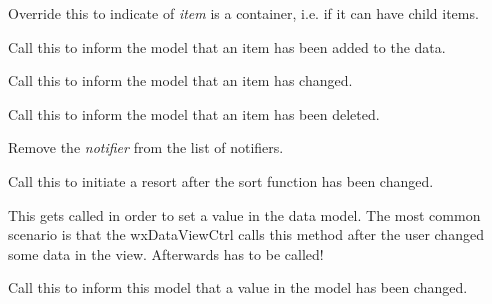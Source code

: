 \label{wxdataviewmodeliscontainer}


Override this to indicate of {\it item} is a container, i.e. if
it can have child items.

\label{wxdataviewmodelitemadded}


Call this to inform the model that an item has been added
to the data.

\label{wxdataviewmodelitemchanged}


Call this to inform the model that an item has changed.

\label{wxdataviewmodelitemdeleted}


Call this to inform the model that an item has been deleted.

\label{wxdataviewmodelremovenotifier}


Remove the {\it notifier} from the list of notifiers.

\label{wxdataviewmodelresort}


Call this to initiate a resort after the sort function has
been changed.

\label{wxdataviewmodelsetvalue}


This gets called in order to set a value in the data model.
The most common scenario is that the wxDataViewCtrl calls
this method after the user changed some data in the view.
Afterwards 
has to be called!

\label{wxdataviewmodelvaluechanged}


Call this to inform this model that a value in
the model has been changed.

